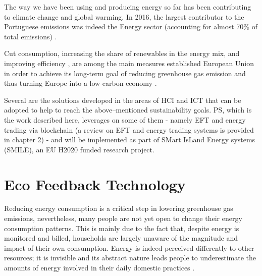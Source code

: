 \label{chap:intro}
\cleardoublepage
The way we have been using and producing energy so far has been contributing to climate change and global warming. In 2016, the largest contributor to the Portuguese emissions was indeed the Energy sector (accounting for almost 70\% of total emissions)\cite{NacionalReport} .


Cut consumption, increasing the share of renewables in the energy mix, and improving efficiency \cite{Europa1, Europa2, Europa3}, are among the main measures established European Union in order to achieve its long-term goal of reducing greenhouse gas emission and thus turning Europe into a low-carbon economy \cite{Europa2050}.


Several are the solutions developed in the areas of \ac{HCI} and \ac{ICT} that can be adopted to help to reach the above--mentioned sustainability goals. \ac{PS}, which is the work described here, leverages on some of them - namely \ac{EFT} and energy trading via blockchain (a review on \ac{EFT} and energy trading systems is provided in chapter 2) - and will be implemented as part of SMart IsLand Energy systems (SMILE), an EU H2020 funded research project.




\section{Eco Feedback Technology}

Reducing energy consumption is a critical step in lowering greenhouse gas emissions, nevertheless, many people are not yet open to change their energy consumption patterns. This is mainly due to the fact that, despite energy is monitored and billed, households are largely unaware of the magnitude and impact of their own consumption. Energy is indeed perceived differently to other resources; it is invisible and its abstract nature leads people to underestimate the amounts of energy involved in their daily domestic practices \cite{ReducingDomesticEnergy}.


